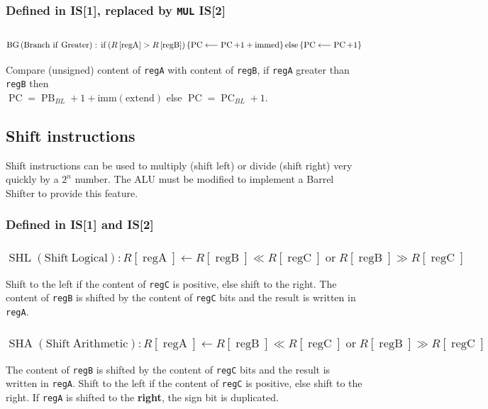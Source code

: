 \documentclass[10pt,a4paper]{article}
\theoremstyle{definition}%
\newcommand{\on}[1]{\operatorname{#1}}
\newcommand{\reg}[1]{\texttt{reg#1}}
\begin{document}
\subsubsection*{ Defined in IS[1], replaced by \texttt{MUL} IS[2]}

\subsubsection{$\on{BG} \on{(Branch~if~Greater)}:\newline \on{if} \left( R\left[ \on{regA} \right] > R\left[ \on{regB} \right]\right) \left\lbrace\on{PC} \longleftarrow \on{PC}+1+\on{immed} \right\rbrace\on{else} \left\lbrace\on{PC} \longleftarrow \on{PC}+1\right\rbrace $}
Compare (unsigned) content of \reg{A} with content of \reg{B}, if \reg{A} greater than \reg{B} then\\$\on{PC}=\on{PB}_{BL}+1+\on{imm(extend)}$ else $\on{PC}=\on{PC}_{BL}+1$.

\subsection{Shift instructions}

Shift instructions can be used to multiply (shift left) or divide (shift right) very quickly by a $2^n$ number. The ALU must be modified to implement a Barrel Shifter to provide this feature.
\subsubsection*{ Defined in IS[1] and IS[2]}
\subsubsection{$\on{SHL} \on{(Shift~ Logical)} : R\left[ \on{regA} \right] \longleftarrow    R\left[ \on{regB} \right] \ll R\left[ \on{regC} \right] \on{or}  R\left[ \on{regB} \right] \gg R\left[ \on{regC} \right] $}
Shift to the left if the content of \reg{C} is positive, else shift to the right. The content of \reg{B} is shifted by the content of \reg{C} bits and the result is written in \reg{A}.

\subsubsection{$\on{SHA} \on{(Shift ~Arithmetic)} : R\left[ \on{regA} \right] \longleftarrow    R\left[ \on{regB} \right] \ll R\left[ \on{regC} \right] \on{or}  R\left[ \on{regB} \right] \gg R\left[ \on{regC} \right] $}
The content of \reg{B} is shifted by the content of \reg{C} bits and the result is written in \reg{A}.
Shift to the left if the content of \reg{C} is positive, else shift to the right.
If \reg{A} is shifted to the \textbf{right}, the sign bit is duplicated.
\end{document}
